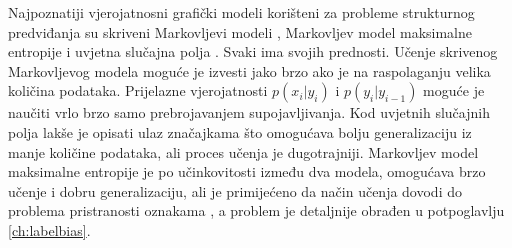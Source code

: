 Najpoznatiji vjerojatnosni grafički modeli korišteni za probleme strukturnog
predviđanja su skriveni Markovljevi modeli ,
Markovljev model maksimalne entropije 
i uvjetna slučajna polja . Svaki ima
svojih prednosti. Učenje skrivenog Markovljevog modela moguće je izvesti jako
brzo ako je na raspolaganju velika količina podataka. Prijelazne vjerojatnosti
$p(x_i | y_i)$ i $p(y_i | y_{i-1})$ moguće je naučiti vrlo brzo samo
prebrojavanjem supojavljivanja. Kod uvjetnih slučajnih polja lakše je opisati
ulaz značajkama što omogućava bolju generalizaciju iz manje količine podataka,
ali proces učenja je dugotrajniji. Markovljev model maksimalne entropije je po
učinkovitosti između dva modela, omogućava brzo učenje i dobru generalizaciju,
ali je primijećeno da način učenja dovodi do problema pristranosti oznakama
 \citep{lafferty2001conditional}, a problem je detaljnije
obrađen u potpoglavlju \ref{ch:labelbias}.

